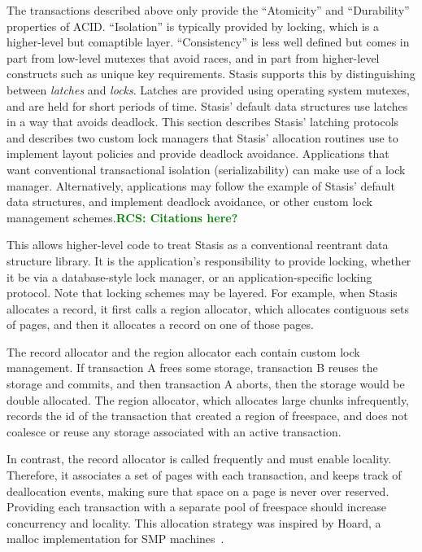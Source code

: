 \documentclass[letterpaper,twocolumn,10pt]{article}
\newcommand{\yad}{Stasis\xspace}
\newcommand{\yads}{Stasis'\xspace}
\newcommand{\rcs}[1]{\textcolor{green}{\bf RCS: #1}}
\begin{document}
The transactions described above only provide the
``Atomicity'' and ``Durability'' properties of ACID.  ``Isolation'' is
typically provided by locking, which is a higher-level but
comaptible layer.  ``Consistency'' is less well defined but comes in
part from low-level mutexes that avoid races, and in part from
higher-level constructs such as unique key requirements.  \yad
supports this by distinguishing between {\em latches} and {\em locks}.
Latches are provided using operating system mutexes, and are held for
short periods of time.  \yads default data structures use latches in a
way that avoids deadlock.  This section describes \yads latching
protocols and describes two custom lock
managers that \yads allocation routines use to implement layout 
policies and provide deadlock avoidance.  Applications that want
conventional transactional isolation (serializability) can make 
use of a lock manager.  Alternatively, applications may follow 
the example of \yads default data structures, and implement 
deadlock avoidance, or other custom lock management schemes.\rcs{Citations here?}

This allows higher-level code to treat \yad as a conventional
reentrant data structure library.  It is the application's
responsibility to provide locking, whether it be via a database-style
lock manager, or an application-specific locking protocol.  Note that
locking schemes may be layered.  For example, when \yad allocates a
record, it first calls a region allocator, which allocates contiguous
sets of pages, and then it allocates a record on one of those pages.

The record allocator and the region allocator each contain custom lock
management.  If transaction A frees some storage, transaction B reuses
the storage and commits, and then transaction A aborts, then the
storage would be double allocated.  The region allocator, which allocates large chunks infrequently, records the id
of the transaction that created a region of freespace, and does not
coalesce or reuse any storage associated with an active transaction.

In contrast, the record allocator is called frequently and must enable locality.  Therefore, it associates a set of pages with
each transaction, and keeps track of deallocation events, making sure
that space on a page is never over reserved.  Providing each
transaction with a separate pool of freespace should increase
concurrency and locality.  This allocation strategy was inspired by
Hoard, a malloc implementation for SMP machines~\cite{hoard}.
\end{document}
